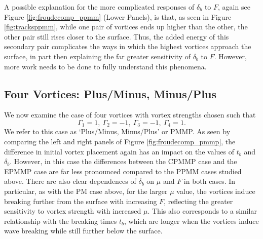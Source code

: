 \documentclass[a4paper,11pt]{article}
\begin{document}
A possible explanation for the more complicated responses of $\delta_{b}$ to $F$, again see Figure \ref{fig:froudecomp_ppmm} (Lower Panels), is that, as seen in Figure \ref{fig:tracksppmm}, while one pair of vortices ends up higher than the other, the other pair still rises closer to the surface.  Thus, the added energy of this secondary pair complicates the ways in which the highest vortices approach the surface, in part then explaining the far greater sensitivity of $\delta_{b}$ to $F$.  However, more work needs to be done to fully understand this phenomena.  

\subsection{Four Vortices: Plus/Minus, Minus/Plus}
We now examine the case of four vortices with vortex strengths chosen such that
\[
\Gamma_{1}=1, ~ \Gamma_{2}=-1, ~ \Gamma_{3}=-1,~\Gamma_{4}=1.
\]
We refer to this case as `Plus/Minus, Minus/Plus' or PMMP.  As seen by comparing the left and right panels of Figure \ref{fig:froudecomp_pmmp}, the difference in initial vortex placement again has an impact on the values of $t_{b}$ and $\delta_{b}$.  However, in this case the differences between the CPMMP case and the EPMMP case are far less pronounced compared to the PPMM cases studied above.  There are also clear dependences of $\delta_{b}$ on $\mu$ and $F$ in both cases.  In particular, as with the PM case above, for the larger $\mu$ value, the vortices induce breaking further from the surface with increasing $F$, reflecting the greater sensitivity to vortex strength with increased $\mu$.  
This also corresponds to a similar relationship with the breaking times $t_{b}$, which are longer 
when the vortices induce wave breaking while still further below the surface.  
\end{document}
